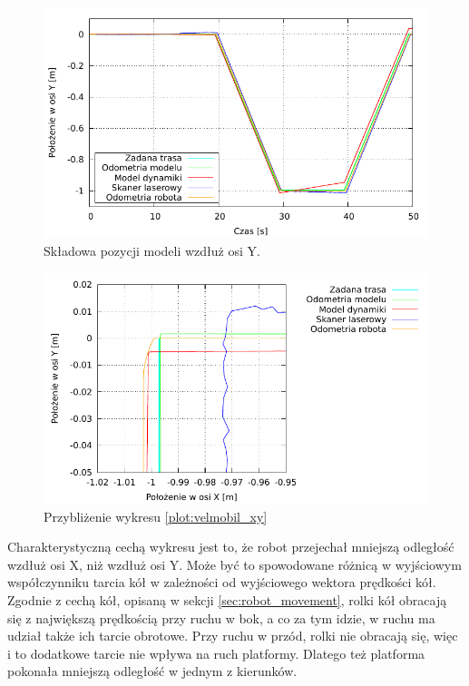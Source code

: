 		\begin{figure}[H]
			\centering
			\includegraphics[width=\textwidth]{plots/velmobil_yt.pdf}
				\caption{Składowa pozycji modeli wzdłuż osi Y.}
			\label{plot:velmobil_yt}
		\end{figure}
		
		\begin{figure}[H]
			\centering
			\includegraphics[width=\textwidth]{plots/velmobil_xy_s.pdf}
				\caption{Przybliżenie wykresu \ref{plot:velmobil_xy}}
			\label{plot:velmobil_xy_s}
		\end{figure}
		
		Charakterystyczną cechą wykresu jest to, że robot przejechał mniejszą odległość wzdłuż osi X, niż wzdłuż osi Y.
		Może być to spowodowane różnicą w wyjściowym współczynniku tarcia kół w zależności od wyjściowego wektora prędkości kół.
		Zgodnie z cechą kół, opisaną w sekcji \ref{sec:robot_movement}, rolki kół obracają się z największą prędkością przy ruchu w bok, a co za tym idzie, w ruchu ma udział także
		ich tarcie obrotowe. Przy ruchu w przód, rolki nie obracają się, więc i to dodatkowe tarcie nie wpływa na ruch platformy.
		Dlatego też platforma pokonała mniejszą odległość w jednym z kierunków.
		
